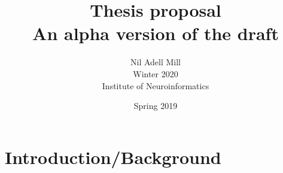 \documentclass{article}
\begin{document}

\title{\Large Thesis proposal \\ \small An alpha version of the draft}
\author{Nil Adell Mill \\
        Winter 2020 \\
        Institute of Neuroinformatics \\}
\date{Spring 2019}

\maketitle



    \section*{Introduction/Background}
    
\end{document}
